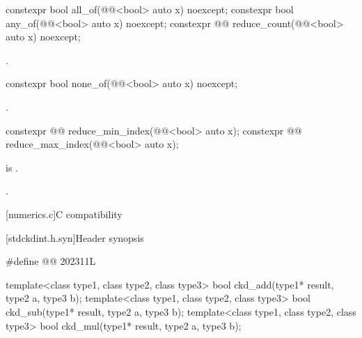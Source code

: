 \begin{itemdecl}
constexpr bool all_of(@@<bool> auto x) noexcept;
constexpr bool any_of(@@<bool> auto x) noexcept;
constexpr @@ reduce_count(@@<bool> auto x) noexcept;
\end{itemdecl}

\begin{itemdescr}
\pnum
\returns
{}.
\end{itemdescr}

\begin{itemdecl}
constexpr bool none_of(@@<bool> auto x) noexcept;
\end{itemdecl}

\begin{itemdescr}
\pnum
\returns
{}.
\end{itemdescr}

\begin{itemdecl}
constexpr @@ reduce_min_index(@@<bool> auto x);
constexpr @@ reduce_max_index(@@<bool> auto x);
\end{itemdecl}

\begin{itemdescr}
\pnum
\expects
{} is .

\pnum
\returns
{}.
\end{itemdescr}

[numerics.c]{C compatibility}

[stdckdint.h.syn]{Header  synopsis}

%
\begin{codeblock}
#define @@ 202311L

template<class type1, class type2, class type3>
  bool ckd_add(type1* result, type2 a, type3 b);
template<class type1, class type2, class type3>
  bool ckd_sub(type1* result, type2 a, type3 b);
template<class type1, class type2, class type3>
  bool ckd_mul(type1* result, type2 a, type3 b);
\end{codeblock}

\pnum
{}   %

